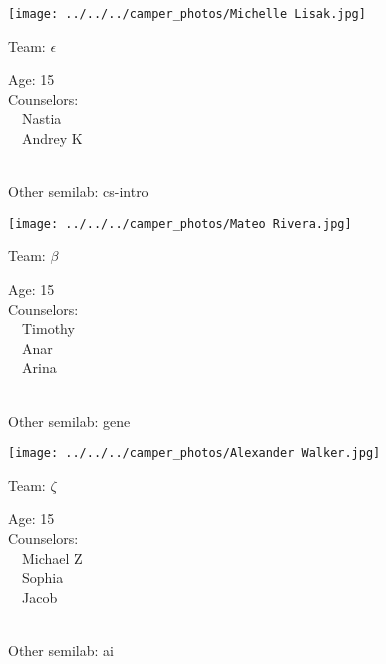 \documentclass[10pt,letterpaper, landscape]{article}
\begin{document}
\horizontalshiftfornextsticker
\renewcommand{\baselinestretch}{1} \begin{sticker}
\noindent\begin{minipage}{0.5\textwidth}\texttt{[image: ../../../camper\_photos/Michelle Lisak.jpg]}\end{minipage}\begin{minipage}{0.45\textwidth}
Team: {\Large $\epsilon$}

Age:        15\\
Counselors: \\\ \ Nastia\\\ \ Andrey K\\
\end{minipage} \\ \vspace{0.07in}
Other semilab: cs-intro
\end{sticker}
\horizontalshiftfornextsticker
\renewcommand{\baselinestretch}{1} \begin{sticker}
\noindent\begin{minipage}{0.5\textwidth}\texttt{[image: ../../../camper\_photos/Mateo Rivera.jpg]}\end{minipage}\begin{minipage}{0.45\textwidth}
Team: {\Large $\beta$}

Age:        15\\
Counselors: \\\ \ Timothy\\\ \ Anar\\\ \ Arina\\
\end{minipage} \\ \vspace{0.07in}
Other semilab: gene
\end{sticker}
\verticalshiftfornextsticker
\renewcommand{\baselinestretch}{1} \begin{sticker}
\noindent\begin{minipage}{0.5\textwidth}\texttt{[image: ../../../camper\_photos/Alexander Walker.jpg]}\end{minipage}\begin{minipage}{0.45\textwidth}
Team: {\Large $\zeta$}

Age:        15\\
Counselors: \\\ \ Michael Z\\\ \ Sophia\\\ \ Jacob\\
\end{minipage} \\ \vspace{0.07in}
Other semilab: ai
\end{sticker}
\end{document}
